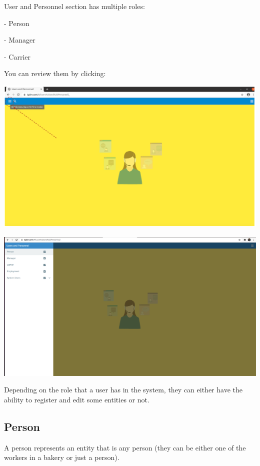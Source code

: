 User and Personnel section has multiple roles: 

- Person 

- Manager

- Carrier

You can review them by clicking:

\includegraphics[width=\textwidth]{sections/01-chapter/images/review1.png}



\includegraphics[width=\textwidth]{sections/01-chapter/images/personnel.png}



Depending on the role that a user has in the system, they can either have the ability to register and edit some entities or not. 

\subsection{Person}
A person represents an entity that is any person (they can be either one of the workers in a bakery or just a person).

